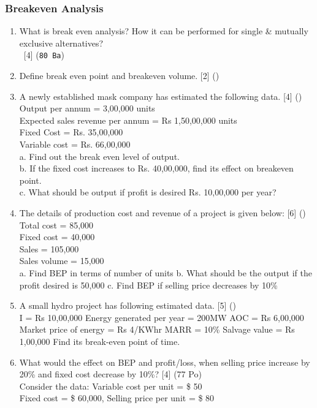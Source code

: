 \documentclass[12pt]{article}
\newcommand{\enter}{\\\textcolor{white}{1}}
\begin{document}
	\subsubsection{Breakeven Analysis}
		\begin{enumerate}
			\item What is break even analysis? How it can be performed for single \& mutually exclusive alternatives?
			\enter\hfill [4] (\texttt{80 Ba})

			\item Define break even point and breakeven volume. \hfill [2] ()

			\item A newly established mask company has estimated the following data. \hfill [4] ()\\
			Output per annum = 3,00,000 units\\
			Expected sales revenue per annum = Rs 1,50,00,000 units\\
			Fixed Cost = Rs. 35,00,000\\
			Variable cost = Rs. 66,00,000\\
			a. Find out the break even level of output.\\
			b. If the fixed cost increases to Rs. 40,00,000, find its effect on breakeven point.\\
			c. What should be output if profit is desired Rs. 10,00,000 per year?

			\item The details of production cost and revenue of a project is given below: \hfill [6] ()\\
			Total cost = 85,000\\
			Fixed cost = 40,000\\
			Sales = 105,000\\
			Sales volume = 15,000\\
			a. Find BEP in terms of number of units
			b. What should be the output if the profit desired is 50,000
			c. Find BEP if selling price decreases by 10\%

			\item A small hydro project has following estimated data. \hfill [5] ()\\
			I = Rs 10,00,000
			Energy generated per year = 200MW
			AOC = Rs 6,00,000
			Market price of energy = Rs 4/KWhr
			MARR = 10\%
			Salvage value = Rs 1,00,000
			Find its break-even point of time.

			\item What would the effect on BEP and profit/loss, when selling price increase by 20\% and fixed cost decrease by 10\%? \hfill [4] (77 Po)\\
			Consider the data: Variable cost per unit = \$ 50\\
			Fixed cost = \$ 60,000, Selling price per unit = \$ 80


\end{enumerate}
\end{document}
